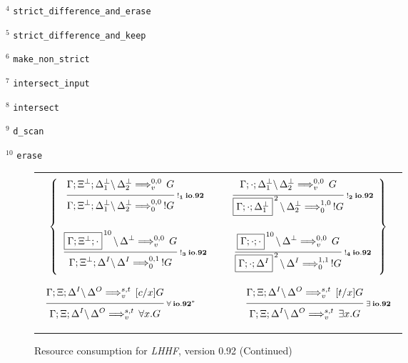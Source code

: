 \bigskip

$^4$ {\tt strict\_difference\_and\_erase}

$^5$ {\tt strict\_difference\_and\_keep}

$^6$ {\tt make\_non\_strict}

$^7$ {\tt intersect\_input}

$^8$ {\tt intersect}

$^9$ {\tt d\_scan}

$^{10}$ {\tt erase}

\clearpage
\begin{figure}[t]
  \begin{center}
    \leavevmode

    \begin{tabular}{|c|}
      \hline \\
      $\left\{
        \begin{array}{ccc}
          \ruleI
            {\ioIXc{\G;\X^\Bot;\D_1^\Bot}{\D_2^\Bot}{G}{v}{0,0}}
            {\ioIXc{\G;\X^\Bot;\D_1^\Bot}{\D_2^\Bot}{!G}{0}{0,0}}
            {!_1 \: io.92}
        &
          \hspace{0.5em}
        &
          \ruleI
            {\ioIXc{\G;\cdot;\D_1^\Bot}{\D_2^\Bot}{G}{v}{0,0}}
            {\ioIXc{\fb{\G;\cdot;\D_1^\Bot}{2}}{\D_2^\Bot}{!G}{0}{1,0}}
            {!_2 \: io.92}
        \\ & & \\
          \ruleI
            {\ioIXc{\fb{\G;\X^\Bot;\cdot}{10}}{\D^\Bot}{G}{v}{0,0}}
            {\ioIXc{\G;\X^\Bot;\D^I}{\D^I}{!G}{0}{0,1}}
            {!_3 \: io.92}
        &
          \hspace{0.5em}
        &
          \ruleI
            {\ioIXc{\fb{\G;\cdot;\cdot}{10}}{\D^\Bot}{G}{v}{0,0}}
            {\ioIXc{\fb{\G;\cdot;\D^I}{2}}{\D^I}{!G}{0}{1,1}}
            {!_4 \: io.92}
        \end{array}
      \right\}$

      \\ \\ \\
      $\begin{array}{ccc}
        \ruleI
          {\ioIXc{\G;\X;\D^I}{\D^O}{[c/x]G}{v}{s,t}}
          {\ioIXc{\G;\X;\D^I}{\D^O}{\A x. G}{v}{s,t}}
          {\A \: io.92^*}
      &
        \hspace{3em}
      &
        \ruleI
          {\ioIXc{\G;\X;\D^I}{\D^O}{[t/x]G}{v}{s,t}}
          {\ioIXc{\G;\X;\D^I}{\D^O}{\E x. G}{v}{s,t}}
          {\E \: io.92}
      \end{array}$
      \\ \\
      \hline
    \end{tabular}

    \caption{Resource consumption for {\em LHHF}, version 0.92 (Continued)}
    \label{fig:RC_IXc3}
  \end{center}
\end{figure}



